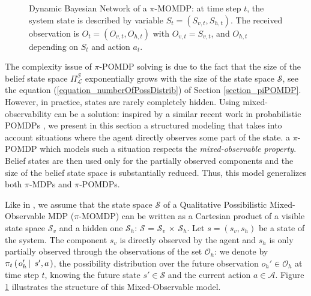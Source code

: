 \begin{figure}[b!]
\caption[Dynamic Bayesian Network of a $\pi$-MOMDP]{
Dynamic Bayesian Network of a $\pi$-MOMDP:
at time step $t$, the system state is described 
by variable $S_t = (S_{v,t},S_{h,t})$.
The received observation is $O_t=(O_{v,t},O_{h,t})$
with $O_{v,t}=S_{v,t}$, 
and $O_{h,t}$ depending on $S_t$ and action $a_t$.}
\label{piMOMDP}
\end{figure}

The complexity issue of $\pi$-POMDP solving is due to the fact that the size of the
belief state space $\Pi^{\mathcal{S}}_{\mathcal{L}}$ exponentially grows with the size of the state space $\mathcal{S}$, see the equation (\ref{equation_numberOfPossDistrib})
of Section \ref{section_piPOMDP}.
However, in practice, states are rarely completely hidden.
Using mixed-observability can be a solution: inspired by a similar recent work in probabilistic POMDPs 
\cite{OngShaoHsuWee-IJRR10,AraThoBufCha-ICTAI10}, we present in this section a structured modeling that takes into
account situations where the agent directly observes some part of the state.
a $\pi$-POMDP which models such a situation respects the \textit{mixed-observable property}. 
Belief states are then used only for the partially observed components and the
size of the belief state space is substantially reduced. Thus, this model generalizes both
$\pi$-MDPs and $\pi$-POMDPs.

Like in \cite{AraThoBufCha-ICTAI10}, we assume that the state space $\mathcal{S}$
of a Qualitative Possibilistic Mixed-Observable MDP ($\pi$-MOMDP) 
can be written as a Cartesian 
product of a visible state space $\mathcal{S}_{v}$ and a hidden one $\mathcal{S}_h$: $\mathcal{S}$ = 
$\mathcal{S}_v$ $\times$ $\mathcal{S}_h$.
Let $s=(s_v,s_h)$ be a state of the system. The component $s_v$ is directly
 observed by the agent and $s_h$ is only partially observed through the 
observations of the set $\mathcal{O}_h$: 
we denote by $\pi_t \left( \left. o_h' \, \right| \left. \, s',a  \right. \right)$,
the possibility distribution over the 
future observation $o_h' \in \mathcal{O}_h$
at time step $t$, 
knowing the future state $s' \in \mathcal{S}$ 
and the current action $a \in \mathcal{A}$. 
Figure \ref{piMOMDP} illustrates the structure 
of this Mixed-Observable model. 

